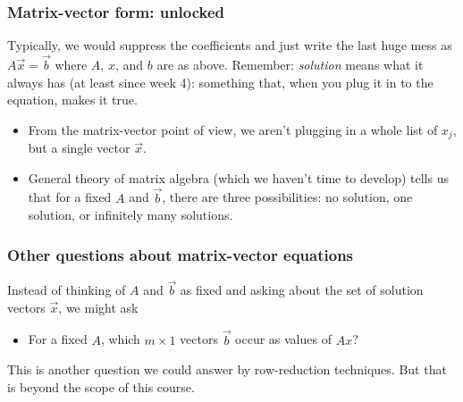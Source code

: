 \begin{frame}

\frametitle{Matrix-vector form: unlocked}
\label{matrix-vectorform:unlocked}

Typically, we would suppress the coefficients and just write the last huge mess as $ A\vec{x} = \vec{b} $ where $ A $, $ x $, and $ b $ are as above. Remember: \emph{solution} means what it always has (at least since week 4): something that, when you plug it in to the equation, makes it true.

\begin{itemize}
\item From the matrix-vector point of view, we aren't plugging in a whole list of $ x_j $, but a single vector $ \vec{x} $.

\item General theory of matrix algebra (which we haven't time to develop) tells us that for a fixed $ A $ and $ \vec{b} $, there are three possibilities: no solution, one solution, or infinitely many solutions.

\end{itemize}

\end{frame}

\begin{frame}

\frametitle{Other questions about matrix-vector equations}
\label{otherquestionsaboutmatrix-vectorequations}

Instead of thinking of $ A $ and $ \vec{b} $ as fixed and asking about the set of solution vectors $ \vec{x} $, we might ask

\begin{itemize}
\item For a fixed $ A $, which $ m \times 1 $ vectors $ \vec{b} $ occur as values of $ Ax $?

\end{itemize}

This is another question we could answer by row-reduction techniques. But that is beyond the scope of this course.

\end{frame}

